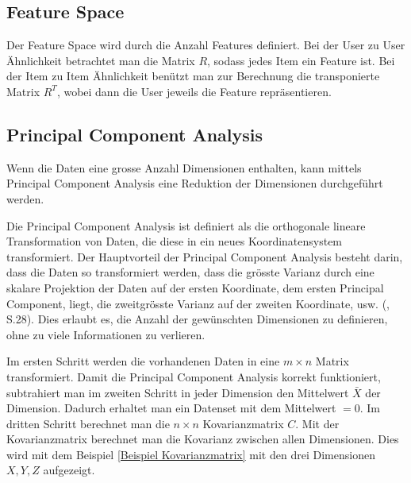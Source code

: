 \subsection{Feature Space}
Der Feature Space wird durch die Anzahl Features definiert.
Bei der User zu User Ähnlichkeit betrachtet man die Matrix $R$, sodass jedes Item ein Feature ist. Bei der Item zu Item Ähnlichkeit benützt man zur Berechnung die transponierte Matrix $R^T$, wobei dann die User jeweils die Feature repräsentieren.


\subsection{Principal Component Analysis}
Wenn die Daten eine grosse Anzahl Dimensionen enthalten, kann mittels Principal Component Analysis eine Reduktion der Dimensionen durchgeführt werden.

Die Principal Component Analysis ist definiert als die orthogonale lineare Transformation von Daten, die diese in ein neues Koordinatensystem transformiert. Der Hauptvorteil der Principal Component Analysis besteht darin, dass die Daten so transformiert werden, dass die grösste Varianz durch eine skalare Projektion der Daten auf der ersten Koordinate, dem ersten Principal Component, liegt, die zweitgrösste Varianz auf der zweiten Koordinate, usw. (\cite{jolliffe_principal_2002}, S.28). Dies erlaubt es, die Anzahl der gewünschten Dimensionen zu definieren, ohne zu viele Informationen zu verlieren.


Im ersten Schritt werden die vorhandenen Daten in eine $m\times n$ Matrix transformiert. Damit die Principal Component Analysis korrekt funktioniert, subtrahiert man im zweiten Schritt in jeder Dimension den Mittelwert $\bar{X}$ der Dimension. Dadurch erhaltet man ein Datenset mit dem Mittelwert $= 0$.
Im dritten Schritt berechnet man die $n\times n$ Kovarianzmatrix $C$. Mit der Kovarianzmatrix berechnet man die Kovarianz zwischen allen Dimensionen. Dies wird mit dem Beispiel \eqref{Beispiel Kovarianzmatrix} mit den drei Dimensionen $X,Y,Z$ aufgezeigt.


